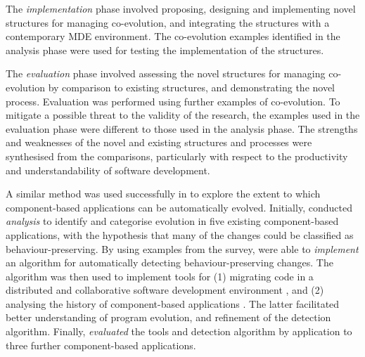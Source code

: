 The \emph{implementation} phase involved proposing, designing and implementing novel structures for managing co-evolution, and integrating the structures with a contemporary MDE environment. The co-evolution examples identified in the analysis phase were used for testing the implementation of the structures.

The \emph{evaluation} phase involved assessing the novel structures for managing co-evolution by comparison to existing structures, and demonstrating the novel process. Evaluation was performed using further examples of co-evolution. To mitigate a possible threat to the validity of the research, the examples used in the evaluation phase were different to those used in the analysis phase. The strengths and weaknesses of the novel and existing structures and processes were synthesised from the comparisons, particularly with respect to the productivity and understandability of software development.

A similar method was used successfully in \cite{dig07thesis} to explore the extent to which component-based applications can be automatically evolved. Initially, \cite{dig06apis} conducted \emph{analysis} to identify and categorise evolution in five existing component-based applications, with the hypothesis that many of the changes could be classified as behaviour-preserving. By using examples from the survey, \cite{dig06detection} were able to \emph{implement} an algorithm for automatically detecting behaviour-preserving changes. The algorithm was then used to implement tools for (1) migrating code in a distributed and collaborative software development environment \cite{dig06automatic}, and (2) analysing the history of component-based applications \cite{dig07cms}. The latter facilitated better understanding of program evolution, and refinement of the detection algorithm. Finally, \cite{dig07thesis} \emph{evaluated} the tools and detection algorithm by application to three further component-based applications.